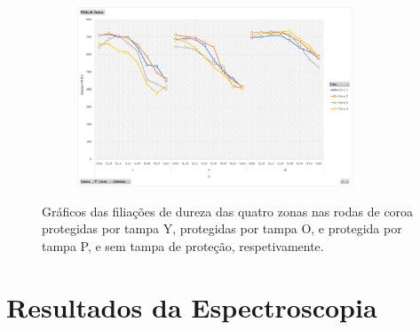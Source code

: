 \begin{figure}[htb]
\begin{subfigure}{.4\textwidth}
        \caption{}
        \label{fig:resultados_Tampa_P_dent}
    \end{subfigure}%
    \begin{subfigure}{.4\textwidth}
        \centering
        \includegraphics[width = 0.9\textwidth]{Figures/Cap4/Grafico_4_Zonas_ST.png}
        \caption{}
        \label{fig:resultados_ST_dent}
    \end{subfigure}
    \caption[Filiações de dureza das quatro zonas na roda de coroa DB45 Nº 1]%
    {Gráficos das filiações de dureza das quatro zonas nas rodas de coroa protegidas por tampa Y, protegidas por tampa O, e protegida por tampa P, e sem tampa de proteção, respetivamente.}
    \label{fig:resultados_4T_dent}
\end{figure}
\section{Resultados da Espectroscopia} \label{sec:resultados_espectroscopia}